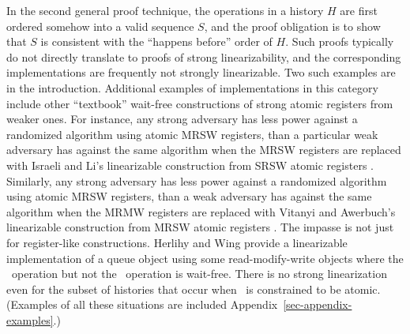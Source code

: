 \documentclass[11pt,letterpaper]{article}
\begin{document}
In the second general proof technique,
the operations in a history $H$ are first ordered somehow into a valid sequence $S$,
and the proof obligation is to show that $S$ is consistent with the ``happens before'' order of $H$.
Such proofs typically do not directly translate to proofs of strong linearizability,
and the corresponding implementations are frequently not strongly linearizable.
Two such examples are in the introduction.
Additional examples of implementations in this category include other ``textbook'' wait-free constructions of
strong atomic registers from weaker ones.
For instance,
any strong adversary has less power against a randomized algorithm using atomic MRSW registers, than
a particular weak adversary has against the same algorithm when the MRSW registers are replaced with
Israeli and Li's linearizable construction from SRSW atomic registers \cite{il:timestamps}.
Similarly, any strong adversary has less power against a randomized algorithm using atomic MRSW registers, than
a weak adversary has against the same algorithm when the MRMW registers are replaced with
Vitanyi and Awerbuch's linearizable construction from MRSW atomic registers \cite{vit:atom}.
The impasse is not just for register-like constructions.
Herlihy and Wing \cite{her:lin} provide a linearizable implementation
of a queue object using some read-modify-write objects where the \Enqueue\ operation but not the \Dequeue\ operation is wait-free.
There is no strong linearization even for the subset of histories that occur
when \Dequeue\ is constrained to be atomic.
(Examples of all these situations are included Appendix~\ref{sec-appendix-examples}.)

\renewcommand{\gets}{\ensuremath{:=}}
\newcommand{\algospacing}{\renewcommand{\baselinestretch}{1}}
\newcommand{\AlgoBracks}[1]{\AlgoBrackL #1 \AlgoBrackR}
\newcommand{\alref}[1]{{\ref{#1}}}
\newcommand{\lref}[1]{line~{\ref{#1}}}
\newcommand{\lrefs}[1]{lines~{\ref{#1}}}
\newcommand{\Lref}[1]{Line~{\ref{#1}}}
\newcommand{\llref}[2]{lines~{\ref{#1}}--{\ref{#2}}}
\newcommand{\Llref}[2]{Lines~{\ref{#1}}--{\ref{#2}}}


\newenvironment{myindentpar}[1]
{\begin{list}{}
     {\setlength{\leftmargin}{#1}
     \setlength{\topsep}{1pt}
     \setlength{\itemsep}{1pt}
     \setlength{\parskip}{0pt}
     \setlength{\parsep}{0pt}}
     \item[]
}
{\end{list}}
\newcommand{\vardeclar}[1]{\begin{myindentpar}{1cm}#1\end{myindentpar}}
\end{document}
